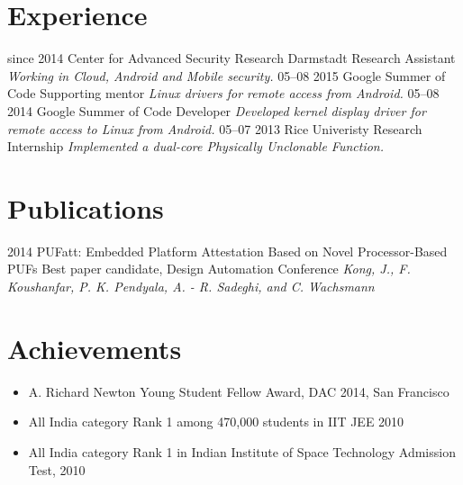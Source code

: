 \documentclass[]{friggeri-cv}
\begin{document}
\section{Experience}

\begin{entrylist}
  \entry
    {since 2014}
    {Center for Advanced Security Research Darmstadt}
    {Research Assistant}
    {\emph{Working in Cloud, Android and Mobile security.}}
  \entry
    {05–08 2015}
    {Google Summer of Code}
    {Supporting mentor}
    {\emph{Linux drivers for remote access from Android.}}
  \entry
    {05–08 2014}
    {Google Summer of Code}
    {Developer}
    {\emph{Developed kernel display driver for remote access to Linux from Android.}}
  \entry
    {05–07 2013}
    {Rice Univeristy}
    {Research Internship}
    {\emph{Implemented a dual-core Physically Unclonable Function.}}
\end{entrylist}

\section{Publications}
\begin{entrylist}
  \entry
    {2014}
    {PUFatt: Embedded Platform Attestation Based on Novel Processor-Based PUFs}
    {Best paper candidate, Design Automation Conference}
    {\emph{Kong, J., F. Koushanfar, P. K. Pendyala, A. - R. Sadeghi, and C. Wachsmann}}
\end{entrylist}

\section{Achievements}
\begin{itemize}
  \item A. Richard Newton Young Student Fellow Award, DAC 2014, San Francisco
  \item All India category Rank 1 among 470,000 students in IIT JEE 2010
  \item All India category Rank 1 in Indian Institute of Space Technology Admission Test, 2010
\end{itemize}
~
\end{document}
